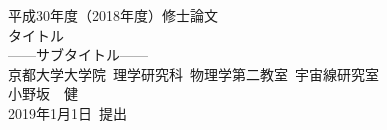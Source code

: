\begin{titlepage}
\begin{spacing}{2.3}

\begin{center}
\vspace*{80truept}
{\huge 平成30年度（2018年度）修士論文}\\
\vspace{30truept}
{\huge タイトル}\\ %
{\LARGE ------サブタイトル------}\\ %
\vspace{100truept}
{\large 京都大学大学院\ 理学研究科\ 物理学第二教室\ 宇宙線研究室}\\ %
{\LARGE 小野坂　健}\\ %
{\LARGE 2019年1月1日\ 提出}\\ %

\end{center}

\end{spacing}
\end{titlepage}